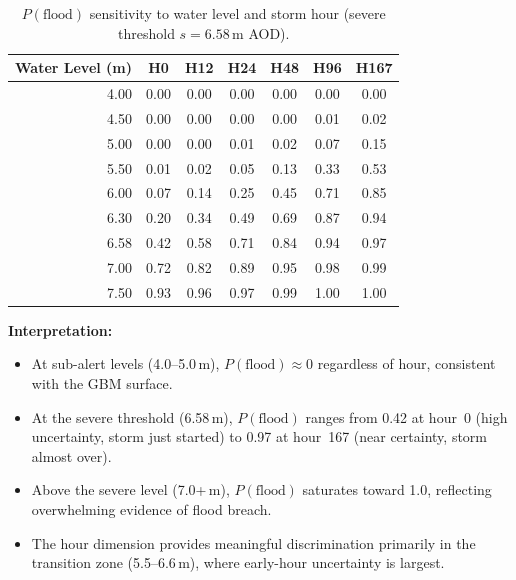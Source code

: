 
\begin{table}[H]
    \centering
    \caption{$P(\text{flood})$ sensitivity to water level and storm hour
             (severe threshold $s = 6.58$\,m AOD).}
    \label{tab:sens_pflood_surface}
    \begin{tabular}{rcccccc}
        \toprule
        \textbf{Water Level (m)} & \textbf{H0} & \textbf{H12} & \textbf{H24}
            & \textbf{H48} & \textbf{H96} & \textbf{H167} \\
        \midrule
        4.00 & 0.00 & 0.00 & 0.00 & 0.00 & 0.00 & 0.00 \\
        4.50 & 0.00 & 0.00 & 0.00 & 0.00 & 0.01 & 0.02 \\
        5.00 & 0.00 & 0.00 & 0.01 & 0.02 & 0.07 & 0.15 \\
        5.50 & 0.01 & 0.02 & 0.05 & 0.13 & 0.33 & 0.53 \\
        6.00 & 0.07 & 0.14 & 0.25 & 0.45 & 0.71 & 0.85 \\
        6.30 & 0.20 & 0.34 & 0.49 & 0.69 & 0.87 & 0.94 \\
        6.58 & 0.42 & 0.58 & 0.71 & 0.84 & 0.94 & 0.97 \\
        7.00 & 0.72 & 0.82 & 0.89 & 0.95 & 0.98 & 0.99 \\
        7.50 & 0.93 & 0.96 & 0.97 & 0.99 & 1.00 & 1.00 \\
        \bottomrule
    \end{tabular}
\end{table}

\noindent\textbf{Interpretation:}
\begin{itemize}[nosep]
    \item At sub-alert levels (4.0--5.0\,m), $P(\text{flood}) \approx 0$
          regardless of hour, consistent with the GBM surface.
    \item At the severe threshold (6.58\,m), $P(\text{flood})$ ranges from
          0.42 at hour~0 (high uncertainty, storm just started) to 0.97 at
          hour~167 (near certainty, storm almost over).
    \item Above the severe level (7.0+\,m), $P(\text{flood})$ saturates
          toward 1.0, reflecting overwhelming evidence of flood breach.
    \item The hour dimension provides meaningful discrimination primarily in
          the transition zone (5.5--6.6\,m), where early-hour uncertainty is
          largest.
\end{itemize}

